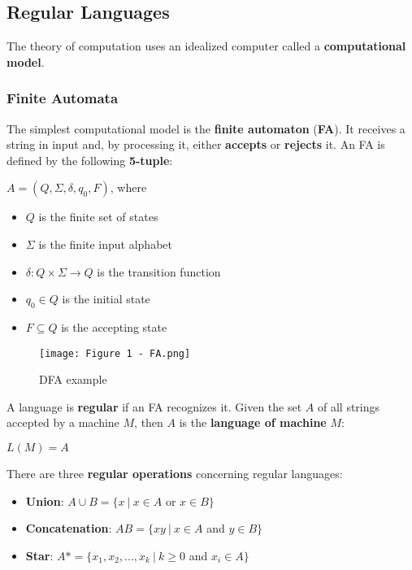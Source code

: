 \documentclass{article}
\begin{document}
\subsection{Regular Languages}
The theory of computation uses an idealized computer called a \textbf{computational model}. 
\subsubsection{Finite Automata}
The simplest computational model is the \textbf{finite automaton} (\textbf{FA}). It receives a string in input and, by processing it, either \textbf{accepts} or \textbf{rejects} it. 
An FA is defined by the following \textbf{5-tuple}:
\begin{center}
    $A = (Q, \Sigma, \delta, q_0, F)$, where
\end{center}
\begin{itemize}
    \item $Q$ is the finite set of states
    \item $\Sigma$ is the finite input alphabet
    \item $\delta:Q\times\Sigma\rightarrow Q$ is the transition function
    \item $q_0 \in Q$ is the initial state
    \item $F \subseteq Q$ is the accepting state
\end{itemize}
\begin{figure}[H]
    \centering
    \texttt{[image: Figure 1 - FA.png]}
    \caption{DFA example}
\end{figure}
\noindent
A language is \textbf{regular} if an FA recognizes it. Given the set $A$ of all strings accepted by a machine $M$, then $A$ is the \textbf{language of machine} $M$:
\begin{center}
    $L(M) = A$ 
\end{center}
\newpage
\noindent
There are three \textbf{regular operations} concerning regular languages:
\begin{itemize}
    \item \textbf{Union}: $A \cup B = \{x \ | \ x \in A$ or $x \in B\}$
    \item \textbf{Concatenation}: $AB = \{xy \ | \ x \in A$ and $y \in B\}$
    \item \textbf{Star}: $A* = \{x_1,x_2,...,x_k \ | \ k \geq 0$ and $x_i \in A\}$
\end{itemize}
\end{document}
